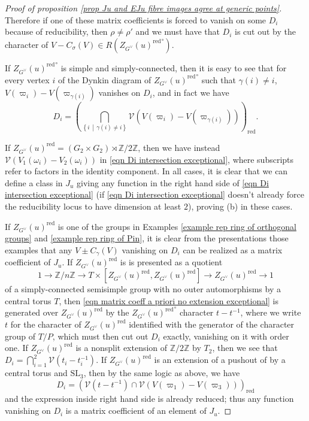 \documentclass[10pt]{article}
\newcommand{\sets}[2]{\left\{#1\,\middle|\,#2\right\}}
\newcommand{\Z}{\mathbb{Z}}
\newcommand{\SL}{\mathrm{SL}}
\theoremstyle{definition}
\theoremstyle{remark}
\newcommand{\Zur}{Z_{G^\vee}(u)^{\mathrm{red}}}
\begin{document}
\begin{proof}[Proof of proposition \ref{prop Ju and EJu fibre images agree at generic points}]
Therefore if one of these matrix coefficients is 
forced to vanish on some $D_i$ because of reducibility, then $\rho\neq\rho'$
and we must have that $D_i$ is cut
out by the character of $V-C_\sigma(V)\in R({\Zur}^\circ)$.

If ${\Zur}^\circ$ is simple and simply-connected, then it is easy to see that for every 
vertex $i$ of the Dynkin diagram of ${\Zur}^\circ$ such that $\gamma(i)\neq i$, $V(\varpi_i)-V(\varpi_{\gamma(i)})$
vanishes on $D_i$, and in fact we have
%
\begin{equation}
\label{eqn Di intersection exceptional}
D_i=\left(\bigcap_{\sets{i}{\gamma(i)\neq i}}\mathcal{V}\left(V(\varpi_i)- V(\varpi_{\gamma(i)})\right)
\right)_{\mathrm{red}}.
\end{equation}
%

If $\Zur=(G_2\times G_2)\rtimes\Z/2\Z$, then 
we have instead $\mathcal{V}\left(V_1(\omega_i)-V_2(\omega_i)\right)$ in 
\eqref{eqn Di intersection exceptional}, where subscripts refer to 
factors in the identity component. In all cases, it is clear that we can define
a class in $J_u$ giving any function in the right hand side of  
\eqref{eqn Di intersection exceptional} (if \eqref{eqn Di intersection exceptional} doesn't already force the reducibility locus to have dimension at least $2$), proving (b) in these cases.

If $\Zur$ is one of the groups in Examples \ref{example rep ring of orthogonal groups} and \ref{example rep ring of Pin}, it is clear from the presentations those examples that any $V\pm C_\gamma(V)$ vanishing on $D_i$ can be realized as a matrix coefficient of $J_u$. If $\Zur$ is 
is presented as a quotient
%
\[
1\to \Z/n\Z\to T\times[\Zur,\Zur]\to\Zur\to 1
\]
%
of a simply-connected semisimple group with no outer automorphisms by a central torus $T$, then 
\eqref{eqn matrix coeff a priori no extension exceptional} is generated
over $\Zur$ by the ${\Zur}^\circ$ character $t-t^{-1}$, where we write $t$ for the character
of $\Zur$ identified with the generator of the character group of $T/P$,
which must then cut 
out $D_i$ exactly, vanishing on it with order one. If $\Zur$ is a nonsplit extension of $\Z/2\Z$ by $T_2$, then we see that 
$D_i=\bigcap_{i=1}^2\mathcal{V}\left(t_i-t_i^{-1}\right)$. If
$\Zur$ is an extension of a pushout of by a central torus and $\SL_3$, then by the same logic as above, we have
%
\[
D_i=\left(\mathcal{V}\left(t-t^{-1}\right)\cap\mathcal{V}\left(V(\varpi_1)-V(\varpi_3)\right)\right)_{\mathrm{red}}
\]
%
and the expression inside right hand side is already reduced; thus any function vanishing on $D_i$ is a matrix coefficient of an element 
of $J_u$.


\end{proof}
\end{document}
